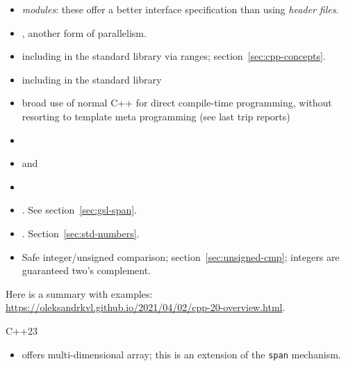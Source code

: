 \begin{itemize}
\item   \emph{modules}: these offer a better interface
  specification than using
  \emph{header files}.
\item   {}, another form of parallelism.
\item   {} including in the standard library via
  ranges; section~\ref{sec:cpp-concepts}.
\item   {} including in the standard library
\item   broad use of normal C++ for direct compile-time programming, without
  resorting to template meta programming (see last trip reports)
\item {}
\item   {} and 
\item   {}
\item {}. See section~\ref{sec:gsl-span}.
\item {}. Section~\ref{sec:std-numbers}.
\item Safe integer/unsigned comparison; section~\ref{sec:unsigned-cmp};
  integers are guaranteed two's complement.
\end{itemize}

Here is a summary with examples:
\url{https://oleksandrkvl.github.io/2021/04/02/cpp-20-overview.html}.


 {C++23}

\begin{itemize}
\item {} offers multi-dimensional array;
  this is an extension of the  \lstinline{span} mechanism.  
\end{itemize}

